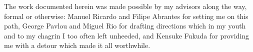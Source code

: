 \begin{acknowledgements}

The work documented herein was made possible by my advisors along the way, formal or otherwise: Manuel Ricardo and Filipe Abrantes for setting me on this path, George Pavlou and Miguel Rio for drafting directions which in my youth and to my chagrin I too often left unheeded, and Kensuke Fukuda for providing me with a detour which made it all worthwhile.

\end{acknowledgements}

%



